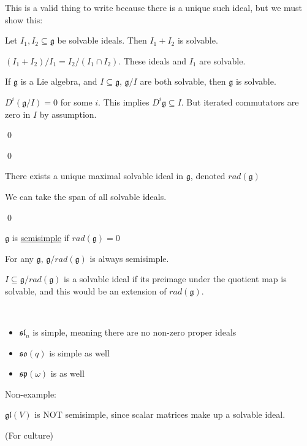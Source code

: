 \documentclass[x11names,reqno,14pt]{extarticle}
\newcommand{\mk}[1]{\mathfrak{#1}}
\newcommand{\g}{\mk{g}}
\newcommand{\so}{\mk{s}\mk{o}}
\newcommand{\rad}{rad}
\renewcommand{\sp}{\mk{s}\mk{p}}
\newcommand{\gl}{\mk{g}\mk{l}}
\renewcommand{\sl}{\mk{s}\mk{l}}
\begin{document}
This is a valid thing to write because there is a unique such ideal, but we must show this: 

\lem

Let $I_1, I_2 \subseteq \g$ be solvable ideals. Then $I_1 + I_2$ is solvable. 

\proof

$(I_1 + I_2)/I_1 = I_2/(I_1\cap I_2)$. These ideals and $I_1$ are solvable. 

\claim

If $\g$ is a Lie algebra, and $I \subseteq \g$, $\g/I$ are both solvable, then $\g$ is solvable. 

\proof

$D^i(\g/I) = 0$ for some $i$. This implies $D^i\g \subseteq I$. But iterated commutators are zero in $I$ by assumption. 

\qed

\qed

\cor

There exists a unique maximal solvable ideal in $\g$, denoted $\rad(\g)$

\proof

We can take the span of all solvable ideals. 

\qed


$\g$ is \underline{semisimple} if $\rad(\g) = 0$

\prop

For any $\g$, $\g/\rad(\g)$ is always semisimple. 

\proof

$I\subseteq \g/\rad(\g)$ is a solvable ideal if its preimage under the quotient map is solvable, and this would be an extension of $\rad(\g)$. 

\exm
\,
\begin{itemize}

\item $\sl_n$ is simple, meaning there are no non-zero proper ideals

\item $\so(q)$ is simple as well

\item $\sp(\omega)$ is as well

\end{itemize}

Non-example:

$\gl(V)$ is NOT semisimple, since scalar matrices make up a solvable ideal.

(For culture)
\end{document}
